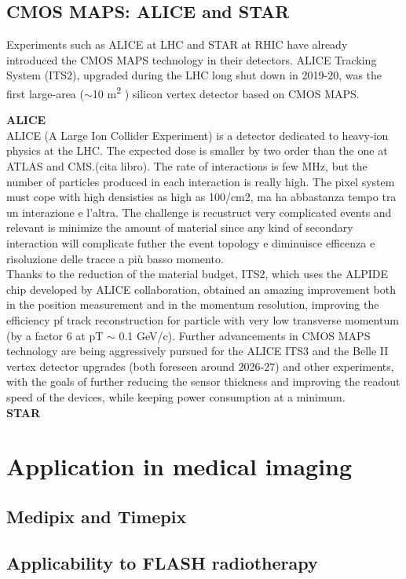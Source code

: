         
    \subsection{CMOS MAPS: ALICE and STAR}
        Experiments such as ALICE at LHC and STAR at RHIC have already introduced the CMOS MAPS technology in their detectors. ALICE Tracking System (ITS2), upgraded during the LHC long shut down in 2019-20, was the first large-area ($\sim$10 \si{m\squared} ) silicon vertex detector based on CMOS MAPS.

        \textbf{ALICE}\\
        ALICE (A Large Ion Collider Experiment) is a detector dedicated to heavy-ion physics at the LHC.
        The expected dose is smaller by two order than the one at ATLAS and CMS.(cita libro). The rate of interactions is few \si{MHz}, but the number of particles produced in each interaction is really high. The pixel system must cope with high densisties as high as 100/cm2, ma ha abbastanza tempo tra un interazione e l'altra. 
        The challenge is recustruct very complicated events and relevant is minimize the amount of material since any kind of secondary interaction will complicate futher the event topology e diminuisce efficenza e risoluzione delle tracce a più basso momento. \\
        Thanks to the reduction of the material budget, ITS2, which uses the ALPIDE chip developed by ALICE collaboration, obtained an amazing improvement both in the position measurement and in the momentum resolution, improving the efficiency pf track reconstruction for particle with very low transverse momentum (by a factor 6 at pT $\sim$ 0.1 GeV/c). Further advancements in CMOS MAPS technology are being aggressively pursued for the ALICE ITS3 and the Belle II vertex detector upgrades (both foreseen around 2026-27) and other experiments, with the goals of further reducing the sensor thickness and improving the readout speed of the devices, while keeping power consumption at a minimum.\\
        \textbf{STAR}\\

\section{Application in medical imaging}
    \subsection{Medipix and Timepix}
    \subsection{Applicability to FLASH radiotherapy}